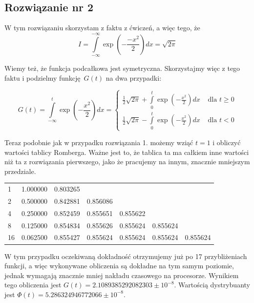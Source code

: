 \documentclass[a4paper,12pt]{article}
\begin{document}
\subsection{Rozwiązanie nr 2}

W tym rozwiązaniu skorzystam z faktu z ćwiczeń, a więc tego, że
\[ 
    I = \int\limits_{-\infty}^{-\infty} \exp \left(- \frac{-x^2}{2} \right) dx
        = \sqrt{2\pi}    
\]

\noindent Wiemy też, że funkcja podcałkowa jest symetryczna. Skorzystajmy więc
z tego faktu i podzielmy funkcję $G(t)$ na dwa przypadki:

\[ 
    G(t) = \int\limits_{-\infty}^{t} \exp \left( - \frac{x^2}{2} \right) dx =
    \begin{cases}
        \frac{1}{2} \sqrt{2\pi} + \int\limits_{0}^{t} \exp \left( - \frac{x^2}{2}
        \right) dx & \text{ dla } t \geq 0 \\
        \frac{1}{2} \sqrt{2\pi} - \int\limits_{0}^{t} \exp \left( - \frac{x^2}{2}
        \right) dx & \text{ dla } t < 0
    \end{cases}
\]

\noindent Teraz podobnie jak w przypadku rozwiązania 1. możemy wziąć $t = 1$
i obliczyć wartości tablicy Romberga. Ważne jest to, że tablica ta ma całkiem
inne wartości niż ta z rozwiązania pierwszego, jako że pracujemy na innym,
znacznie mniejszym przedziale.

\begin{table}[H]
    \begin{tabular}{lllllll}
    1  & 1.000000 & 0.803265 &          &          &          &          \\
    2  & 0.500000 & 0.842881 & 0.856086 &          &          &          \\
    4  & 0.250000 & 0.852459 & 0.855651 & 0.855622 &          &          \\
    8  & 0.125000 & 0.854834 & 0.855626 & 0.855624 & 0.855624 &          \\
    16 & 0.062500 & 0.855427 & 0.855624 & 0.855624 & 0.855624 & 0.855624
    \end{tabular}
\end{table}

\noindent W tym przypadku oczekiwaną dokładność otrzymujemy już po 17 
przybliżeniach funkcji, a więc wykonywane obliczenia są dokładne na tym samym 
poziomie, jednak wymagają znacznie mniej nakładu czasowego na procesorze. Wynikiem
tego obliczenia jest $G(t) = 2.1089385292082303 \pm 10^{-8}$.
Wartością dystrybuanty jest $\Phi(t) = 5.286324946772066 \pm 10^{-8}$.
\end{document}
